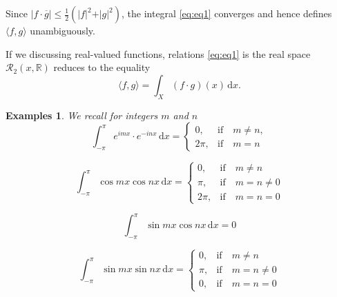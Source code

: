 \documentclass[a4paper,12pt]{article}
\newtheorem{example}{Examples}
\begin{document}
    Since $\displaystyle \vert f \cdot \overline{g} \vert \le \frac{1}{2} 
    \left(\vert f \vert^2 + \vert g \vert^2\right)$, the integral \ref{eq:eq1}
    converges and hence defines $\langle f, g \rangle $ unambiguously.

    If we discussing real-valued functions, relations \ref{eq:eq1} is the 
    real space $\mathcal{R}_2(x,\mathbb{R})$ reduces to the equality 
    \begin{equation}
        \langle f, g \rangle = \int_X \left(f \cdot g \right)(x)\, \mathrm{d}x.
    \end{equation}

    \begin{example}
        \emph{We recall for integers $m$ and $n$}
            \begin{equation}
                \int_{-\pi}^{\pi} e^{imx} \cdot e^{-inx}\, \mathrm{d}x = 
                \left\{\begin{array}{rl} 
                    0, & \mathrm{ if } \quad m \ne n, \\
                    2\pi, & \mathrm{ if } \quad m = n
                \end{array}\right.
                \label{eq:eq2}
            \end{equation}

            \begin{equation}
                \int_{-\pi}^{\pi} \cos mx \cos nx\, \mathrm{d}x = \left\{
                    \begin{array}{rl} 0, &  \mathrm{ if } \quad m \ne n \\
                                    \pi, &  \mathrm{ if } \quad m = n \ne 0 \\
                                   2\pi, &  \mathrm{ if } \quad m = n = 0
                    \end{array} \right.
                    \label{eq:eq3}
            \end{equation}

            \begin{equation}
                \int_{-\pi}^{\pi} \sin mx \cos nx\, \mathrm{d}x = 0
                    \label{eq:eq4}
            \end{equation}

            \begin{equation}
                \int_{-\pi}^{\pi} \sin mx \sin nx\, \mathrm{d}x = \left\{
                    \begin{array}{rl} 0, & \mathrm{ if } \quad m \ne n \\
                                    \pi, & \mathrm{ if } \quad m = n \ne 0 \\
                                      0, & \mathrm{ if } \quad m = n = 0
                    \end{array} \right.
                    \label{eq:eq5}
            \end{equation}
    \end{example}
\end{document}
